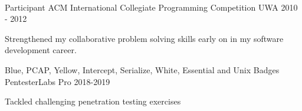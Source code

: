 
 \

\begin{cventries}

  \cventry
    {Participant} %
    {ACM International Collegiate Programming Competition} %
    {UWA} %
    {2010 - 2012} %
    {
      \begin{cvitems} %
        \item {Strengthened my collaborative problem solving skills early on in my software development career.}
      \end{cvitems}
    }

  \cventry
    {Blue, PCAP, Yellow, Intercept, Serialize, White, Essential and Unix Badges} %
    {PentesterLabs Pro} %
    {} %
    {2018-2019} %
    {
    \begin{cvitems} %
      \item {Tackled challenging penetration testing exercises}
    \end{cvitems}
    }

\end{cventries}
